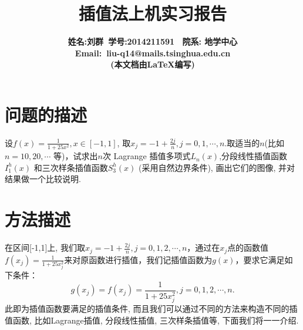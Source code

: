 \documentclass[a4paper]{article}
\begin{document}
\begin{spacing}{1.5}
\begin{CJK*}{GBK}{song}
\title{\bf{插值法上机实习报告}}
\author{\bf{姓名:刘群\ 学号:2014211591 \ 院系: 地学中心}\\ \bf{Email}:\ liu-q14@mails.tsinghua.edu.cn \\ (本文档由\LaTeX{}编写)}
\date{}
\maketitle


\section{问题的描述}
设$f(x)=\frac{1}{1+25x^2}, x\in [-1, 1]$, 取$x_j=-1+\frac{2j}{n}, j=0,1,\cdots,n.$取适当的$n$(比如
$n=10, 20,\cdots$ 等)，试求出$n$次 Lagrange 插值多项式$L_n(x)$,分段线性插值函数$I^h_1(x)$ 和三次样条插值函数$S_3^h(x)$ (采用自然边界条件), 画出它们的图像, 并对结果做一个比较说明.

\section{方法描述}
在区间[-1,1]上, 我们取$x_j=-1+\frac{2j}{n}, j=0,1,2,\cdots,n$，通过在$x_j$点的函数值$f(x_j)=\frac{1}{1+25x_j^2}$来对原函数进行插值，我们记插值函数为$g(x)$，要求它满足如下条件：
\begin{equation}\label{intp_cond}
g(x_j)=f(x_j)=\frac{1}{1+25x_j^2},  j=0,1,2,\cdots,n.
\end{equation}
此即为插值函数要满足的插值条件, 而且我们可以通过不同的方法来构造不同的插值函数, 比如Lagrange插值, 分段线性插值, 三次样条插值等, 下面我们将一一介绍.


\end{CJK*}
\end{spacing}
\end{document}
